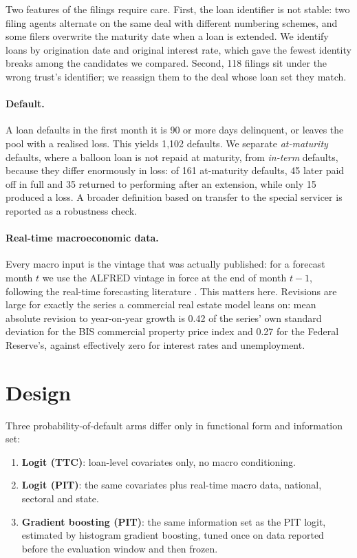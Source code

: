 \documentclass[11pt]{article}
\begin{document}
Two features of the filings require care. First, the loan identifier is not stable: two filing agents alternate on
the same deal with different numbering schemes, and some filers overwrite the maturity date when a loan is
extended. We identify loans by origination date and original interest rate, which gave the fewest identity breaks
among the candidates we compared. Second, 118 filings sit under the wrong trust's identifier; we reassign them to
the deal whose loan set they match.

\paragraph{Default.} A loan defaults in the first month it is 90 or more days delinquent, or leaves the pool with
a realised loss. This yields 1{,}102 defaults. We separate \emph{at-maturity} defaults, where a balloon loan is
not repaid at maturity, from \emph{in-term} defaults, because they differ enormously in loss: of 161 at-maturity
defaults, 45 later paid off in full and 35 returned to performing after an extension, while only 15 produced a
loss. A broader definition based on transfer to the special servicer is reported as a robustness check.

\paragraph{Real-time macroeconomic data.} Every macro input is the vintage that was actually published: for a
forecast month $t$ we use the ALFRED vintage in force at the end of month $t-1$, following the real-time
forecasting literature \citep{croushore2001realtime}. This matters here. Revisions are
large for exactly the series a commercial real estate model leans on: mean absolute revision to year-on-year
growth is 0.42 of the series' own standard deviation for the BIS commercial property price index and 0.27 for the
Federal Reserve's, against effectively zero for interest rates and unemployment.

\section{Design}
\label{sec:design}
Three probability-of-default arms differ only in functional form and information set:
\begin{enumerate}
  \item \textbf{Logit (TTC)}: loan-level covariates only, no macro conditioning.
  \item \textbf{Logit (PIT)}: the same covariates plus real-time macro data, national, sectoral and state.
  \item \textbf{Gradient boosting (PIT)}: the same information set as the PIT logit, estimated by histogram
        gradient boosting, tuned once on data reported before the evaluation window and then frozen.
\end{enumerate}
\end{document}
